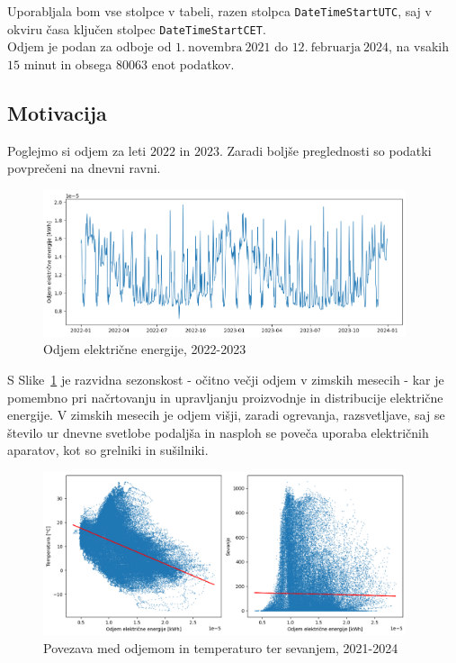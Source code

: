 \documentclass[a4paper, 10pt]{article}
\begin{document}
\noindent Uporabljala bom vse stolpce v tabeli, razen stolpca \texttt{DateTimeStartUTC}, saj v 
okviru časa ključen stolpec \texttt{DateTimeStartCET}.  \\

\noindent Odjem je podan za odboje od $1.~\text{novembra}~2021$ 
do $12.~\text{februarja}~2024$,
na vsakih $15$ minut in obsega $80063$ enot podatkov. \\

\subsection*{Motivacija}

\noindent Poglejmo si odjem za leti $2022$ in $2023$. Zaradi boljše preglednosti 
so podatki povprečeni na dnevni ravni.

\begin{figure}[h!]
    \centering
    \caption{Odjem električne energije, 2022-2023}\par\medskip
    \label{fig:LineGraf}
    \includegraphics[width=0.95\textwidth]{output.png}
\end{figure}

\noindent S Slike~\ref{fig:LineGraf} je razvidna sezonskost - očitno večji odjem v zimskih mesecih - kar je pomembno pri 
načrtovanju in upravljanju proizvodnje in distribucije električne energije. 
V zimskih mesecih je odjem višji, zaradi ogrevanja, razsvetljave, saj se število ur 
dnevne svetlobe podaljša in nasploh se poveča uporaba električnih aparatov, kot 
so grelniki in sušilniki.  \\

\begin{figure}[h!]
    \centering
    \caption{Povezava med odjemom in temperaturo ter sevanjem, 2021-2024}\par\medskip
    \label{fig:Scatter}
    \includegraphics[width=0.95\textwidth]{output_dva.png}
\end{figure}
\end{document}
